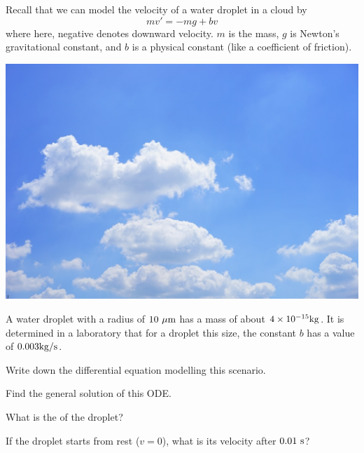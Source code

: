 

\begin{applicationActivities}



\begin{observation}
Recall that we can model the velocity of a water droplet in a cloud by
\[mv'=-mg+bv\]
where here, negative denotes downward velocity.  \(m\) is the mass, \(g\) is Newton's gravitational constant, and \(b\) is a physical constant (like a coefficient of friction).
\begin{center}
\includegraphics[scale=0.2]{media/cloud.jpg}
\end{center}
\end{observation}

\begin{activity}{25}
A water droplet with a radius of \(10\ {\rm \mu m}\) has a mass of about \(4 \times 10^{-15} {\rm kg}\).  It is determined in a laboratory that for a droplet this size, the constant \(b\) has a value of \(0.003 {\rm kg/s}\).
\begin{subactivity}
Write down the differential equation modelling this scenario.
\end{subactivity}
\begin{subactivity}
Find the general solution of this ODE.
\end{subactivity}
\begin{subactivity}
What is the  of the droplet?
\end{subactivity}
\begin{subactivity}If the droplet starts from rest (\(v=0\)), what is its velocity after \(0.01\ {\rm s}\)?
\end{subactivity}
\end{activity}


\end{applicationActivities}
